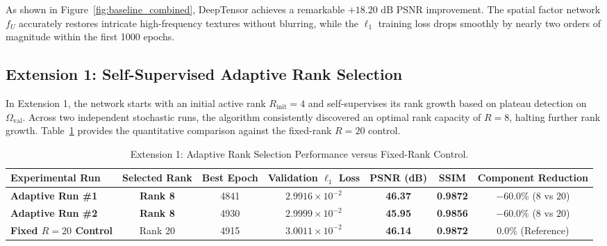 As shown in Figure~\ref{fig:baseline_combined}, DeepTensor achieves a remarkable $+18.20\text{ dB}$ PSNR improvement. The spatial factor network $f_U$ accurately restores intricate high-frequency textures without blurring, while the $\ell_1$ training loss drops smoothly by nearly two orders of magnitude within the first 1000 epochs.

\subsection{Extension 1: Self-Supervised Adaptive Rank Selection}
\label{subsec:ext1_results}
In Extension 1, the network starts with an initial active rank $R_\text{init} = 4$ and self-supervises its rank growth based on plateau detection on $\Omega_\text{val}$. Across two independent stochastic runs, the algorithm consistently discovered an optimal rank capacity of \textbf{$R=8$}, halting further rank growth. Table~\ref{tab:adaptive_rank_results} provides the quantitative comparison against the fixed-rank $R=20$ control.

\begin{table}[htbp]
\centering
\caption{Extension 1: Adaptive Rank Selection Performance versus Fixed-Rank Control.}
\label{tab:adaptive_rank_results}
\begin{adjustbox}{width=0.95\textwidth}
\begin{tabular}{lcccccc}
\toprule
\textbf{Experimental Run} & \textbf{Selected Rank} & \textbf{Best Epoch} & \textbf{Validation $\ell_1$ Loss} & \textbf{PSNR (dB)} & \textbf{SSIM} & \textbf{Component Reduction} \\
\midrule
\textbf{Adaptive Run \#1} & \textbf{Rank 8} & 4841 & $2.9916 \times 10^{-2}$ & \textbf{46.37} & \textbf{0.9872} & \textbf{$-60.0\%$} ($8$ vs $20$) \\
\textbf{Adaptive Run \#2} & \textbf{Rank 8} & 4930 & $2.9999 \times 10^{-2}$ & \textbf{45.95} & \textbf{0.9856} & \textbf{$-60.0\%$} ($8$ vs $20$) \\
\textbf{Fixed $R=20$ Control} & Rank 20 & 4915 & $3.0011 \times 10^{-2}$ & \textbf{46.14} & \textbf{0.9872} & $0.0\%$ (Reference) \\
\bottomrule
\end{tabular}
\end{adjustbox}
\end{table}

